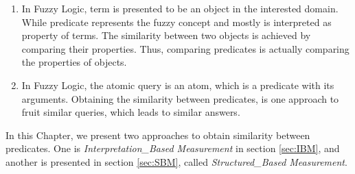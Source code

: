 \begin{enumerate}
\item In Fuzzy Logic, term is presented to be an object in the interested domain. While predicate represents the fuzzy concept and mostly is interpreted as property of terms. The similarity between two objects is achieved by comparing their properties. Thus, comparing predicates is actually comparing the properties of objects.

\item In Fuzzy Logic, the atomic query is an atom, which is a predicate with its arguments. Obtaining the similarity between predicates,  is one approach to fruit similar queries, which leads to similar answers.
\end{enumerate}

In this Chapter, we present two approaches to obtain similarity between predicates. One is \textit{Interpretation\_Based Measurement} in section \ref{sec:IBM}, and another is presented in section \ref{sec:SBM}, called \textit{Structured\_Based Measurement}.